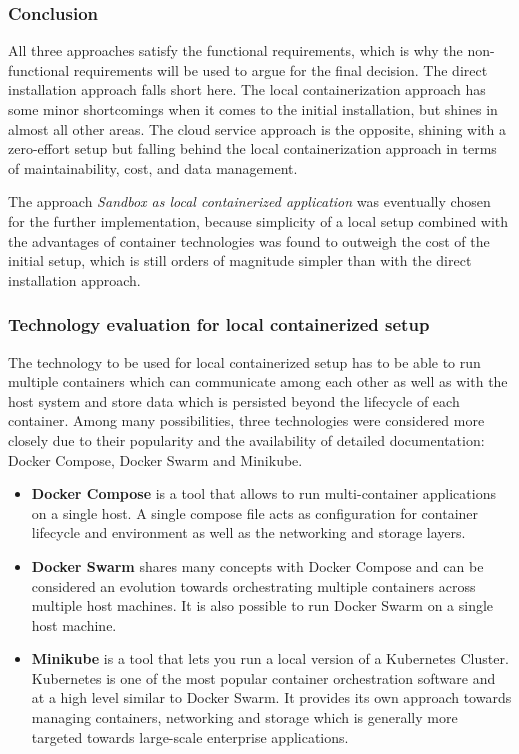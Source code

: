 \documentclass[11pt, a4paper, oneside, parskip=full-]{scrartcl}
\begin{document}
\subsubsection*{Conclusion}
All three approaches satisfy the functional requirements, which is why the
non-functional requirements will be used to argue for the final decision. The
direct installation approach falls short here. The local containerization
approach has some minor shortcomings when it comes to the initial installation,
but shines in almost all other areas. The cloud service approach is the
opposite, shining with a zero-effort setup but falling behind the local
containerization approach in terms of maintainability, cost, and data
management.

The approach \emph{Sandbox as local containerized application} was eventually
chosen for the further implementation, because simplicity of a local setup
combined with the advantages of container technologies was found to outweigh the
cost of the initial setup, which is still orders of magnitude simpler than with
the direct installation approach.

\subsubsection{Technology evaluation for local containerized setup}
The technology to be used for local containerized setup has to be able to run
multiple containers which can communicate among each other as well as with the
host system and store data which is persisted beyond the lifecycle of each
container. Among many possibilities, three technologies were considered more
closely due to their popularity and the availability of detailed documentation:
Docker Compose, Docker Swarm and Minikube.

\begin{itemize}
  \item \textbf{Docker Compose}\cite{dockercompose} is a tool that allows to run
  multi-container applications on a single host. A single compose file acts as
  configuration for container lifecycle and environment as well as the
  networking and storage layers.
  \item \textbf{Docker Swarm}\cite{dockerswarm} shares many concepts with Docker
  Compose and can be considered an evolution towards orchestrating multiple
  containers across multiple host machines. It is also possible to run Docker
  Swarm on a single host machine.
  \item \textbf{Minikube}\cite{minikube} is a tool that lets you run a local
  version of a Kubernetes Cluster. Kubernetes is one of the most popular
  container orchestration software and at a high level similar to Docker Swarm.
  It provides its own approach towards managing containers, networking and
  storage which is generally more targeted towards large-scale enterprise
  applications.
\end{itemize}
\end{document}
